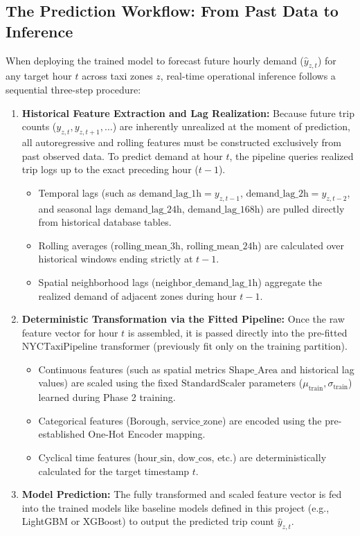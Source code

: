 \documentclass[11pt,a4paper]{article}
\begin{document}
\subsection{The Prediction Workflow: From Past Data to Inference}
When deploying the trained model to forecast future hourly demand ($\hat{y}_{z, t}$) for any target hour $t$ across taxi zones $z$, real-time operational inference follows a sequential three-step procedure:
\begin{enumerate}
    \item \textbf{Historical Feature Extraction and Lag Realization:} 
    Because future trip counts ($y_{z, t}, y_{z, t+1}, \dots$) are inherently unrealized at the moment of prediction, all autoregressive and rolling features must be constructed exclusively from past observed data. To predict demand at hour $t$, the pipeline queries realized trip logs up to the exact preceding hour ($t-1$). 
    \begin{itemize}
        \item Temporal lags (such as $\text{demand\_lag\_1h} = y_{z, t-1}$, $\text{demand\_lag\_2h} = y_{z, t-2}$, and seasonal lags $\text{demand\_lag\_24h}$, $\text{demand\_lag\_168h}$) are pulled directly from historical database tables.
        \item Rolling averages ($\text{rolling\_mean\_3h}$, $\text{rolling\_mean\_24h}$) are calculated over historical windows ending strictly at $t-1$.
        \item Spatial neighborhood lags ($\text{neighbor\_demand\_lag\_1h}$) aggregate the realized demand of adjacent zones during hour $t-1$.
    \end{itemize}
    \item \textbf{Deterministic Transformation via the Fitted Pipeline:}
    Once the raw feature vector for hour $t$ is assembled, it is passed directly into the pre-fitted $\text{NYCTaxiPipeline}$ transformer (previously fit only on the training partition). 
    \begin{itemize}
        \item Continuous features (such as spatial metrics $\text{Shape\_Area}$ and historical lag values) are scaled using the fixed $\text{StandardScaler}$ parameters ($\mu_{\text{train}}, \sigma_{\text{train}}$) learned during Phase 2 training.
        \item Categorical features ($\text{Borough}$, $\text{service\_zone}$) are encoded using the pre-established One-Hot Encoder mapping.
        \item Cyclical time features ($\text{hour\_sin}$, $\text{dow\_cos}$, etc.) are deterministically calculated for the target timestamp $t$.
    \end{itemize}
    \item \textbf{Model Prediction:}
    The fully transformed and scaled feature vector is fed into the trained models like baseline models defined in this project (e.g., LightGBM or XGBoost) to output the predicted trip count $\hat{y}_{z, t}$.
\end{enumerate}
\end{document}
